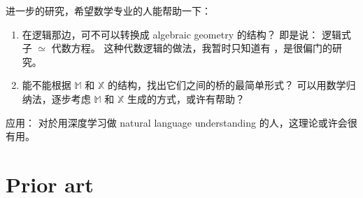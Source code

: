 \documentclass[orivec]{llncs}
\begin{document}
进一步的研究，希望数学专业的人能帮助一下：
\begin{enumerate}
\item 在逻辑那边，可不可以转换成 algebraic geometry 的结构？ 即是说： 逻辑式子 $\simeq$ 代数方程。 这种代数逻辑的做法，我暂时只知道有 \cite{Andreka2001}，是很偏门的研究。
\item 能不能根据 $\mathbb{M}$ 和 $\mathbb{X}$ 的结构，找出它们之间的桥的最简单形式？  可以用数学归纳法，逐步考虑 $\mathbb{M}$ 和 $\mathbb{X}$ 生成的方式，或许有帮助？
\end{enumerate}


应用： 对於用深度学习做 natural language understanding 的人，这理论或许会很有用。 


\section{Prior art}
\end{document}
